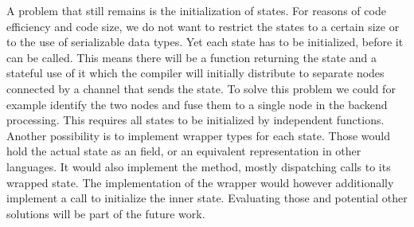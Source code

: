 A problem that still remains is the initialization of states. For reasons of code efficiency and code size, we do not want to restrict the states to a certain size or to the use of serializable data types. Yet each state has to be initialized, before it can be called. This means there will be a function returning the state and a stateful use of it which the compiler will initially distribute to separate nodes connected by a channel that sends the state. To solve this problem we could for example identify the two nodes and fuse them to a single node in the backend processing. This requires all states to be initialized by independent functions. Another possibility is to implement wrapper types for each state. Those would hold the actual state as an  field, or an equivalent representation in other languages. It would also implement the  method, mostly dispatching calls to its wrapped state. The  implementation of the wrapper would however additionally implement a call to initialize the inner state. Evaluating those and potential other solutions will be part of the future work.